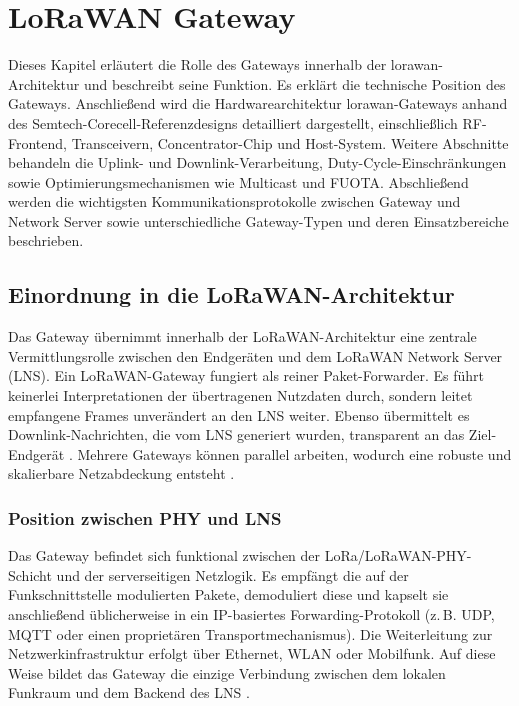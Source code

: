 %
%


\chapter{LoRaWAN Gateway \label{gateway:info}}
	Dieses Kapitel erläutert die Rolle des Gateways innerhalb der \acs{lorawan}-Architektur und beschreibt seine Funktion. Es erklärt die technische Position des Gateways. Anschließend wird die Hardwarearchitektur \ac{lorawan}-Gateways anhand des Semtech-Corecell-Referenzdesigns detailliert dargestellt, einschließlich RF-Frontend, Transceivern, Concentrator-Chip und Host-System. Weitere Abschnitte behandeln die Uplink- und Downlink-Verarbeitung, Duty-Cycle-Einschränkungen sowie Optimierungsmechanismen wie Multicast und FUOTA. Abschließend werden die wichtigsten Kommunikationsprotokolle zwischen Gateway und Network Server sowie unterschiedliche Gateway-Typen und deren Einsatzbereiche beschrieben.
	
\section{Einordnung in die LoRaWAN-Architektur}
	Das Gateway übernimmt innerhalb der LoRaWAN-Architektur eine zentrale Vermittlungsrolle zwischen den Endgeräten und dem LoRaWAN Network Server (LNS). Ein LoRaWAN-Gateway fungiert als reiner Paket-Forwarder. Es führt keinerlei Interpretationen der übertragenen Nutzdaten durch, sondern leitet empfangene Frames unverändert an den LNS weiter. Ebenso übermittelt es Downlink-Nachrichten, die vom LNS generiert wurden, transparent an das Ziel-Endgerät \cite{LoRaAlliance:2020c}. Mehrere Gateways können parallel arbeiten, wodurch eine robuste und skalierbare Netzabdeckung entsteht \cite{Semtech:2024}.

\subsection{Position zwischen PHY und LNS}
	Das Gateway befindet sich funktional zwischen der LoRa\-/LoRaWAN-PHY-Schicht und der serverseitigen Netzlogik. Es empfängt die auf der Funkschnittstelle modulierten Pakete, demoduliert diese und kapselt sie anschlie{\ss}end üblicherweise in ein IP-basiertes Forwarding-Protokoll (z.\,B. UDP, MQTT oder einen proprietären Transportmechanismus). Die Weiterleitung zur Netzwerkinfrastruktur erfolgt über Ethernet, WLAN oder Mobilfunk. Auf diese Weise bildet das Gateway die einzige Verbindung zwischen dem lokalen Funkraum und dem Backend des LNS \cite{LoRaAlliance:2020c} \cite{Montagny:2022} \cite{Semtech:2024}.

